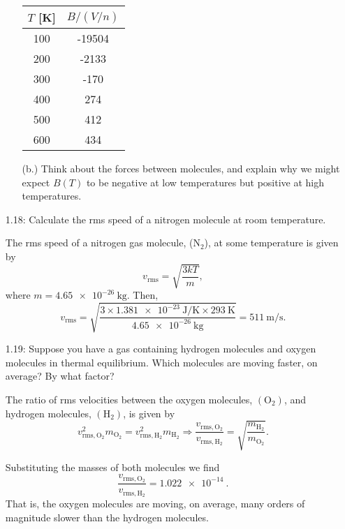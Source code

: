 \documentclass[a4paper, 12pt]{config/homework}
\begin{document}
\begin{enumerate}
\begin{enumerate}
\begin{table}[H]
\begin{center}
\begin{tabular}{cc}
\(T\) {[}K{]} & \(B/(V/n)\) \\ \hline
100           & -19504                                 \\
200           & -2133                                    \\
300           & -170                                  \\
400           & 274                                   \\
500           & 412                                   \\
600           & 434
\end{tabular}
\end{center}
\end{table}

\item[(b.)] Think about the forces between molecules, and explain why we might expect \(B(T)\) to be negative at low temperatures but positive at high temperatures.



\end{enumerate}
\pagebreak
\item[1.18:] Calculate the rms speed of a nitrogen molecule at room temperature.

The rms speed of a nitrogen gas molecule, (\(\text{N}_2\)), at some temperature is given by
\[v_\text{rms} = \sqrt{\frac{3kT}{m}},\]
where \(m=\qty{4.65e-26}{\kg}\). Then,
\[v_\text{rms} = \sqrt{\frac{3\times\qty{1.381e-23}{\joule\per\kelvin}\times\qty{293}{\kelvin}}{{\qty{4.65e-26}{\kg}}}} = \qty{511}{\meter\per\second}.\]

\vspace{\baselineskip}
\item[1.19:] Suppose you have a gas containing hydrogen molecules and oxygen molecules in thermal equilibrium. Which molecules are moving faster, on average? By what factor?

The ratio of rms velocities between the oxygen molecules, \((\text{O}_2)\), and hydrogen molecules, \((\text{H}_2)\), is given by
\[
v_{\text{rms},\text{O}_2}^2 m_{\text{O}_2} = v_{\text{rms},\text{H}_2}^2 m_{\text{H}_2}
\Rightarrow
\frac{v_{\text{rms},\text{O}_2}}{v_{\text{rms},\text{H}_2}} = \sqrt{\frac{m_{\text{H}_2}}{m_{\text{O}_2}}}.
\]

Substituting the masses of both molecules we find
\[\frac{v_{\text{rms},\text{O}_2}}{v_{\text{rms},\text{H}_2}} = \qty{1.022e-14}{}.\]
That is, the oxygen molecules are moving, on average, many orders of magnitude slower than the hydrogen molecules.


\end{enumerate}
\end{document}
